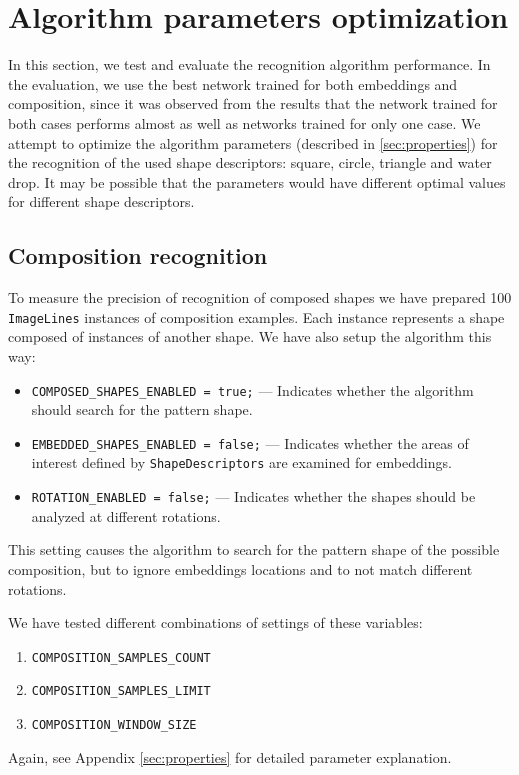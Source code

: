 \section{Algorithm parameters optimization}
In this section, we test and evaluate the recognition algorithm performance. In the evaluation, we use the best network trained for both embeddings and composition, since it was observed from the results that the network trained for both cases performs almost as well as networks trained for only one case. We attempt to optimize the algorithm parameters (described in \cref{sec:properties}) for the recognition of the used shape descriptors: square, circle, triangle and water drop. It may be possible that the parameters would have different optimal values for different shape descriptors.

\subsection{Composition recognition}
To measure the precision of recognition of composed shapes we have prepared 100 \texttt{ImageLines} instances of composition examples. Each instance represents a shape composed of instances of another shape. We have also setup the algorithm this way:
\begin{itemize}
\item \texttt{COMPOSED\_SHAPES\_ENABLED = true;} --- Indicates whether the algorithm should search for the pattern shape.
\item \texttt{EMBEDDED\_SHAPES\_ENABLED = false;} --- Indicates whether the areas of interest defined by \texttt{ShapeDescriptors} are examined for embeddings.
\item \texttt{ROTATION\_ENABLED = false;} --- Indicates whether the shapes should be analyzed at different rotations.
\end{itemize}
This setting causes the algorithm to search for the pattern shape of the possible composition, but to ignore embeddings locations and to not match different rotations.

We have tested different combinations of settings of these variables:
\begin{enumerate}
\item \texttt{COMPOSITION\_SAMPLES\_COUNT}
\item \texttt{COMPOSITION\_SAMPLES\_LIMIT}
\item \texttt{COMPOSITION\_WINDOW\_SIZE} 
\end{enumerate} Again, see Appendix \cref{sec:properties} for detailed parameter explanation.


